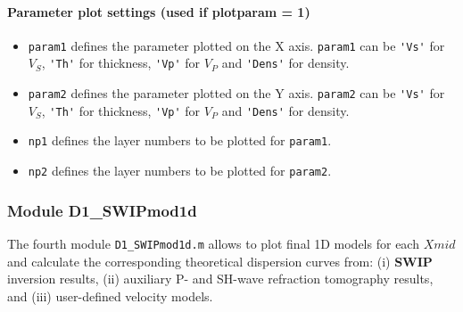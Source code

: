 \documentclass[twoside,a4paper]{article}
\def\SWIP{\textbf{SWIP}}
\begin{document}
\paragraph{Parameter plot settings (used if plotparam = 1)}
\begin{itemize}[leftmargin=*]
\setlength\itemsep{2ex}
\item \verb|param1| defines the parameter plotted on the X axis. \verb|param1| can be \verb|'Vs'| for $V_S$, \verb|'Th'| for thickness, \verb|'Vp'| for $V_P$ and \verb|'Dens'| for density.

\item \verb|param2| defines the parameter plotted on the Y axis. \verb|param2| can be \verb|'Vs'| for $V_S$, \verb|'Th'| for thickness, \verb|'Vp'| for $V_P$ and \verb|'Dens'| for density.

\item \verb|np1| defines the layer numbers to be plotted for \verb|param1|.

\item \verb|np2| defines the layer numbers to be plotted for \verb|param2|.
\end{itemize}

\subsubsection{Module D1\_SWIPmod1d}
The fourth module \verb|D1_SWIPmod1d.m| allows to plot final 1D models for each $Xmid$ and calculate the corresponding theoretical dispersion curves from: (i) {\SWIP} inversion results, (ii) auxiliary P- and SH-wave refraction tomography results, and (iii) user-defined velocity models.
\end{document}
